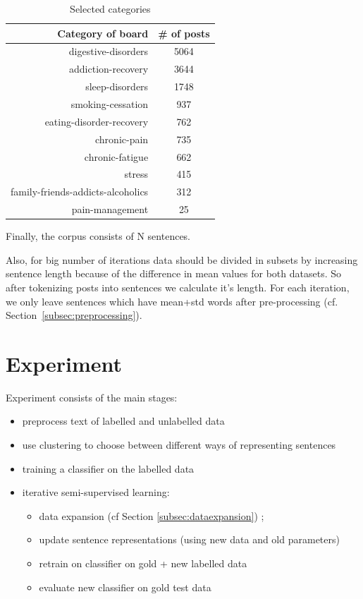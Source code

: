 \documentclass[11pt]{article}
\begin{document}
\begin{table}[htb]
\centering
\begin{tabular}{ |r|c| }
\hline
Category of board &  \# of posts \\ \hline
digestive-disorders & 5064 \\ \hline
addiction-recovery & 3644 \\ \hline
sleep-disorders & 1748 \\ \hline
smoking-cessation & 937 \\ \hline
eating-disorder-recovery & 762 \\ \hline
chronic-pain & 735 \\ \hline
chronic-fatigue & 662 \\ \hline
stress & 415 \\ \hline
family-friends-addicts-alcoholics & 312 \\ \hline
pain-management & 25 \\ \hline
\end{tabular}
\caption{Selected categories}\label{cat_freq}
\end{table}
\FloatBarrier

Finally, the corpus consists of N  sentences. 

Also, for big number of iterations data should be divided in subsets by increasing sentence length because of the difference in mean values for both datasets. So after tokenizing posts into sentences we calculate it's length. For each iteration, we only leave sentences which have mean+std words after pre-processing (cf. Section~\ref{subsec:preprocessing}).


\section{Experiment}
\label{sec:xps}

Experiment consists of the main stages:

\begin{itemize}
\item preprocess text of labelled and unlabelled data
\item use clustering to choose between different ways of representing sentences
\item training a classifier on the labelled data
\item iterative semi-supervised learning:
  \begin{itemize}
  \item data expansion (cf Section \ref{subsec:dataexpansion}) ; 
  \item update sentence representations (using new data and old parameters)
  \item retrain on classifier on gold + new labelled data
  \item evaluate new classifier on gold test data
\end{itemize}
\end{itemize}
\end{document}
